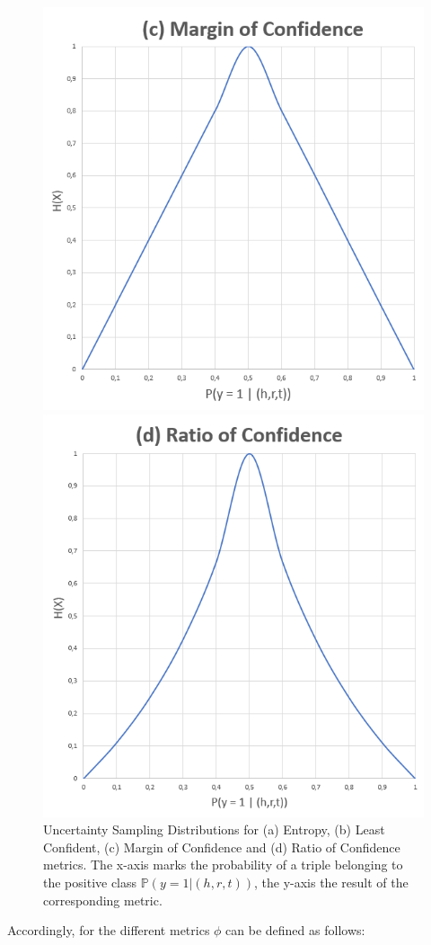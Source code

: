 \begin{figure}
\begin{minipage}{.5\textwidth}
    \end{minipage}
    \begin{minipage}{.5\textwidth}
      \centering
      \includegraphics[width=0.9\linewidth]{figures/smallest_margin_graph.PNG}
    \end{minipage}%
    \begin{minipage}{.5\textwidth}
      \centering
      \includegraphics[width=0.9\linewidth]{figures/smallest_ratio.PNG}
    \end{minipage}%
    \caption{Uncertainty Sampling Distributions for (a) Entropy, (b) Least Confident, (c) Margin of Confidence and (d) Ratio of Confidence metrics.
    The x-axis marks the probability of a triple belonging to the positive class $\mathbb{P}(y = 1 | (h,r,t))$, the y-axis the result of the corresponding metric.}
    \label{fig:sampling_distributions}
\end{figure}
Accordingly, for the different metrics $\phi$ can be defined as follows:
